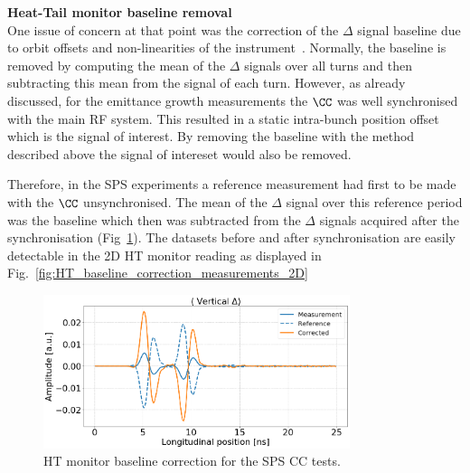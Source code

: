 \normalsize{\textbf{Heat-Tail monitor baseline removal}}\\
One issue of concern at that point was the correction of the $\Delta$ signal  baseline due to orbit offsets and non-linearities of the instrument~\cite{Levens:2313358}.  %
Normally, the baseline is removed by computing the mean of the $\Delta$ signals over all turns and then subtracting this mean from the signal of each turn. However, as already discussed, for the emittance growth measurements the $\CC$ was well synchronised with the main RF system. This resulted in a static intra-bunch position offset which is the signal of interest. By removing the baseline with the method described above the signal of intereset would also be removed.


Therefore, in the SPS experiments a reference measurement had first to be made with the $\CC$ unsynchronised. The mean of the $\Delta$ signal over this reference period was the baseline which then was subtracted from the $\Delta$ signals acquired after the synchronisation (Fig~\ref{fig:HT_baseline_correction}). The datasets before and after synchronisation are easily detectable in the 2D HT monitor reading as displayed in Fig.~\ref{fig:HT_baseline_correction_measurements_2D}

\begin{figure}[!h]
   \centering         
   \includegraphics[width=0.8\textwidth]{images/Ch4/HT_measures_vs_reference_vs_corrected__20180530_135105_baseline_correction.png}
       \caption{HT monitor baseline correction for the SPS CC tests.}
       \label{fig:HT_baseline_correction}
\end{figure}

